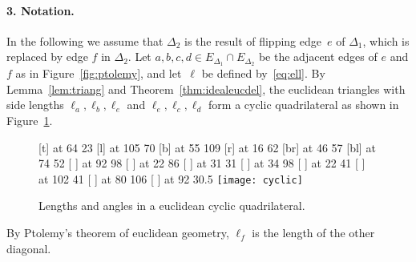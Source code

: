 \documentclass[a4paper, 11pt]{article}
\theoremstyle{plain}
\theoremstyle{definition}
\begin{document}
\paragraph{3. Notation.} In the following we assume that $\Delta_{2}$
is the result of flipping edge~$e$ of $\Delta_{1}$, which is replaced
by edge $f$ in $\Delta_{2}$.
Let $a,b,c,d\in E_{\Delta_{1}}\cap E_{\Delta_{2}}$ be the adjacent edges of
$e$ and $f$ as in Figure~\ref{fig:ptolemy}, and let~$\ell$ be
defined by~\eqref{eq:ell}. By Lemma~\ref{lem:triang} and
Theorem~\ref{thm:idealeucdel}, the euclidean triangles with side
lengths $\ell_{a},\ell_{b},\ell_{e}$ and
$\ell_{e},\ell_{c},\ell_{d}$ form a cyclic quadrilateral as shown in
Figure~\ref{fig:quadnotation}.
\begin{figure}
  \small\hair 2pt
   [t] at 64 23
   [l] at 105 70
   [b] at 55 109
   [r] at 16 62
   [br] at 46 57
   [bl] at 74 52
  \pinlabel {$\alpha$} [ ] at 92 98
  \pinlabel {$\alpha$} [ ] at 22 86
  \pinlabel {$\beta$} [ ] at 31 31
  \pinlabel {$\beta$} [ ] at 34 98
  \pinlabel {$\gamma$} [ ] at 22 41
  \pinlabel {$\gamma$} [ ] at 102 41
  \pinlabel {$\delta$} [ ] at 80 106
  \pinlabel {$\delta$} [ ] at 92 30.5
  \endlabellist
  \centering
  \texttt{[image: cyclic]}
  \caption{Lengths and angles in a euclidean cyclic quadrilateral.}
  \label{fig:quadnotation}
\end{figure}
By Ptolemy's theorem of euclidean geometry, $\ell_{f}$ is the length
of the other diagonal. 
\end{document}
